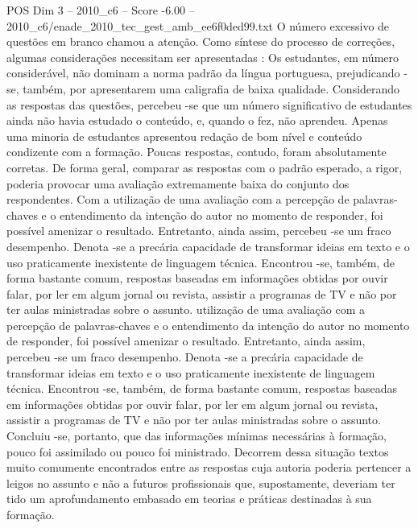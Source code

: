 \begin{textsample}{POS Dim 3 – 2010\_c6 – Score -6.00 – 2010\_c6/enade\_2010\_tec\_gest\_amb\_ee6f0ded99.txt}
O número excessivo de questões em branco chamou a atenção.
Como síntese do processo de correções, algumas considerações necessitam ser apresentadas : Os estudantes, em número considerável, não dominam a norma padrão da língua portuguesa, prejudicando -se, também, por apresentarem uma caligrafia de baixa qualidade.
Considerando as respostas das questões, percebeu -se que um número significativo de estudantes ainda não havia estudado o conteúdo, e, quando o fez, não aprendeu.
Apenas uma minoria de estudantes apresentou redação de bom nível e conteúdo condizente com a formação.
Poucas respostas, contudo, foram absolutamente corretas.
De forma geral, comparar as respostas com o padrão esperado, a rigor, poderia provocar uma avaliação extremamente baixa do conjunto dos respondentes.
Com a utilização de uma avaliação com a percepção de palavras-chaves e o entendimento da intenção do autor no momento de responder, foi possível amenizar o resultado.
Entretanto, ainda assim, percebeu -se um fraco desempenho.
Denota -se a precária capacidade de transformar ideias em texto e o uso praticamente inexistente de linguagem técnica.
Encontrou -se, também, de forma bastante comum, respostas baseadas em informações obtidas por ouvir falar, por ler em algum jornal ou revista, assistir a programas de TV e não por ter aulas ministradas sobre o assunto. utilização de uma avaliação com a percepção de palavras-chaves e o entendimento da intenção do autor no momento de responder, foi possível amenizar o resultado.
Entretanto, ainda assim, percebeu -se um fraco desempenho.
Denota -se a precária capacidade de transformar ideias em texto e o uso praticamente inexistente de linguagem técnica.
Encontrou -se, também, de forma bastante comum, respostas baseadas em informações obtidas por ouvir falar, por ler em algum jornal ou revista, assistir a programas de TV e não por ter aulas ministradas sobre o assunto.
Concluiu -se, portanto, que das informações mínimas necessárias à formação, pouco foi assimilado ou pouco foi ministrado.
Decorrem dessa situação textos muito comumente encontrados entre as respostas cuja autoria poderia pertencer a leigos no assunto e não a futuros profissionais que, supostamente, deveriam ter tido um aprofundamento embasado em teorias e práticas destinadas à sua formação.

\end{textsample}
